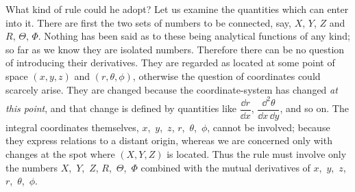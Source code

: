 \documentclass[12pt]{book}
\begin{document}
What kind of rule could he adopt? Let us examine the quantities which
can enter into it. There are first the two sets of numbers to be connected,
say, $X$, $Y$, $Z$ and $R$, $\Theta$, $\Phi$. Nothing has been said as to these being analytical
functions of any kind; so far as we know they are isolated numbers. Therefore
there can be no question of introducing their derivatives. They are regarded
as located at some point of space $(x, y, z)$ and $(r, \theta, \phi)$, otherwise the question
of coordinates could scarcely arise. They are changed because the coordinate-system
has changed \emph{at this point}, and that change is defined by quantities like
$\dfrac{\dd r}{\dd x}$, $\dfrac{\dd^{2}\theta}{\dd x\, \dd y}$, and so on. The integral coordinates themselves, $x$,~$y$,~$z$, $r$,~$\theta$,~$\phi$,
cannot be involved; because they express relations to a distant origin, whereas
we are concerned only with changes at the spot where $(X, Y, Z)$ is located.
Thus the rule must involve only the numbers $X$,~$Y$,~$Z$, $R$,~$\Theta$,~$\Phi$ combined
with the mutual derivatives of $x$,~$y$,~$z$, $r$,~$\theta$,~$\phi$.
\end{document}
